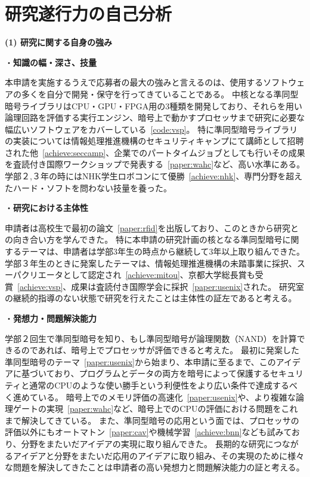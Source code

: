 
\section{研究遂行力の自己分析}

\noindent\textbf{(1) 研究に関する自身の強み}

\noindent・\textbf{知識の幅・深さ、技量}

本申請を実施するうえで応募者の最大の強みと言えるのは、使用するソフトウェアの多くを自分で開発・保守を行ってきていることである。
中核となる準同型暗号ライブラリはCPU・GPU・FPGA用の3種類を開発しており、それらを用い論理回路を評価する実行エンジン、暗号上で動かすプロセッサまで研究に必要な幅広いソフトウェアをカバーしている~\ref{code:vsp}。
特に準同型暗号ライブラリの実装については情報処理推進機構のセキュリティキャンプにて講師として招聘された他~\ref{achieve:seccamp}、企業でのパートタイムジョブとしても行いその成果を査読付き国際ワークショップで発表する~\ref{paper:wahc}など、高い水準にある。
学部２,３年の時にはNHK学生ロボコンにて優勝~\ref{achieve:nhk}、専門分野を超えたハード・ソフトを問わない技量を養った。

\noindent・\textbf{研究における主体性}

申請者は高校生で最初の論文~\ref{paper:rfid}を出版しており、このときから研究との向き合い方を学んできた。
特に本申請の研究計画の核となる準同型暗号に関するテーマは、申請者は学部3年生の時点から継続して3年以上取り組んできた。
学部３年生のときに発案したテーマは、情報処理推進機構の未踏事業に採択、スーパクリエータとして認定され~\ref{achieve:mitou}、京都大学総長賞も受賞~\ref{achieve:vsp}、成果は査読付き国際学会に採択~\ref{paper:usenix}された。
研究室の継続的指導のない状態で研究を行えたことは主体性の証左であると考える。

\noindent・\textbf{発想力・問題解決能力}

学部２回生で準同型暗号を知り、もし準同型暗号が論理関数（NAND）を計算できるのであれば、暗号上でプロセッサが評価できると考えた。
最初に発案した準同型暗号のテーマ~\ref{paper:usenix}から始まり、本申請に至るまで、このアイデアに基づいており、プログラムとデータの両方を暗号によって保護するセキュリティと通常のCPUのような使い勝手という利便性をより広い条件で達成するべく進めている。
暗号上でのメモリ評価の高速化~\ref{paper:usenix}や、より複雑な論理ゲートの実現~\ref{paper:wahc}など、暗号上でのCPUの評価における問題をこれまで解決してきている。
また、準同型暗号の応用という面では、プロセッサの評価以外にもオートマトン~\ref{paper:cav}や機械学習~\ref{achieve:bnn}なども試みており、分野をまたいだアイデアの実現に取り組んできた。
長期的な研究につながるアイデアと分野をまたいだ応用のアイデアに取り組み、その実現のために様々な問題を解決してきたことは申請者の高い発想力と問題解決能力の証と考える。

